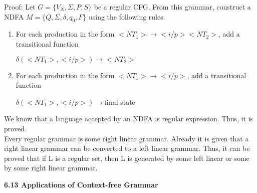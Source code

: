 \documentclass[a4]{article}
\begin{document}
Proof: Let $G = \{V_{N}, \Sigma, P, S \}$ be a regular CFG. From this grammar, construct a NDFA $M = \{Q, \Sigma, \delta,
q_{0}, F\}$ using the following rules.\\
\vspace*{0.2cm}

\begin{enumerate}
  \item For each production in the form $<NT_{1}> \rightarrow <i/p> <NT_{2}>$, add a transitional function\\

  \begin{center}
    $\delta(<NT_{1}>, <i/p>) \rightarrow <NT_{2}>$ \\
  \end{center}

  \item For each production in the form $<NT_{1} > \rightarrow <i/p>$, add a transitional function \\

  \begin{center}
    $\delta(<NT_{1}>, <i/p>) \rightarrow $final state \\
  \end{center}
\end{enumerate}

\vspace*{0.2cm}
\small{
We know that a language accepted by an NDFA is regular expression. Thus, it is proved.\\
\hspace*{0.5cm} Every regular grammar is some right linear grammar. Already it is given that a right linear grammar
can be converted to a left linear grammar. Thus, it can be proved that if L is a regular set, then L is
generated by some left linear or some by some right linear grammar.\\
}

\vspace*{0.4cm}
\large{
\textbf{6.13 Applications of Context-free Grammar}\\
}
\end{document}
